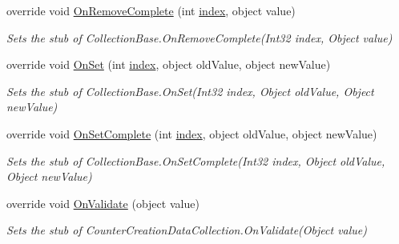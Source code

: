 \begin{DoxyCompactItemize}
override void \hyperlink{class_system_1_1_diagnostics_1_1_fakes_1_1_stub_counter_creation_data_collection_a8353d06ea858b43f51e74958d7d17ae2}{On\-Remove\-Complete} (int \hyperlink{jquery-1_810_82-vsdoc_8js_a75bb12d1f23302a9eea93a6d89d0193e}{index}, object value)
\begin{DoxyCompactList}\small\item\em Sets the stub of Collection\-Base.\-On\-Remove\-Complete(\-Int32 index, Object value)\end{DoxyCompactList}\item 
override void \hyperlink{class_system_1_1_diagnostics_1_1_fakes_1_1_stub_counter_creation_data_collection_a0d25d7335da0480638733e778caafd53}{On\-Set} (int \hyperlink{jquery-1_810_82-vsdoc_8js_a75bb12d1f23302a9eea93a6d89d0193e}{index}, object old\-Value, object new\-Value)
\begin{DoxyCompactList}\small\item\em Sets the stub of Collection\-Base.\-On\-Set(\-Int32 index, Object old\-Value, Object new\-Value)\end{DoxyCompactList}\item 
override void \hyperlink{class_system_1_1_diagnostics_1_1_fakes_1_1_stub_counter_creation_data_collection_a209e3fd6885df0f20551f9f89330172f}{On\-Set\-Complete} (int \hyperlink{jquery-1_810_82-vsdoc_8js_a75bb12d1f23302a9eea93a6d89d0193e}{index}, object old\-Value, object new\-Value)
\begin{DoxyCompactList}\small\item\em Sets the stub of Collection\-Base.\-On\-Set\-Complete(\-Int32 index, Object old\-Value, Object new\-Value)\end{DoxyCompactList}\item 
override void \hyperlink{class_system_1_1_diagnostics_1_1_fakes_1_1_stub_counter_creation_data_collection_a45612f8306b9e008e9dc71d91012bea1}{On\-Validate} (object value)
\begin{DoxyCompactList}\small\item\em Sets the stub of Counter\-Creation\-Data\-Collection.\-On\-Validate(\-Object value)\end{DoxyCompactList}\end{DoxyCompactItemize}
